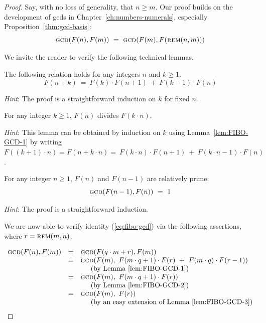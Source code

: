 \begin{proof}
Say, with no loss of generality,  that $n \geq m$.   Our proof builds on the development of {\sc gcd}s in Chapter~\ref{ch:numbers-numerals}, especially Proposition~\ref{thm:gcd-basis}:
\[ \mbox{\sc gcd}(F(n),F(m)) \ = \ \mbox{\sc gcd}(F(m), F(\mbox{\sc rem}(n,m))) \]

\medskip

\noindent
We invite the reader to verify the following technical lemmas.


\begin{lemma}
\label{lem:FIBO-GCD-1}
The following relation holds for any integers $n$ and $k \geq 1$.
\[  F(n+k) \ = \ F(k) \cdot F(n+1) \ + \ F(k-1) \cdot F(n) \] 
\end{lemma}

\noindent
{\em Hint}: The proof is a straightforward induction on $k$ for fixed $n$.

\begin{lemma}
\label{lem:FIBO-GCD-2}
For any integer $k \geq 1$, $F(n)$ divides $F(k \cdot n)$.
\end{lemma}

\noindent
{\em Hint}: This lemma can be obtained by induction on $k$ using Lemma~\ref{lem:FIBO-GCD-1}
by writing $F((k+1) \cdot n) = F(n + k \cdot n) = \ F(k \cdot n) \cdot F(n+1) \ + \ F(k \cdot n - 1) \cdot F(n)$.

\begin{lemma}
\label{lem:FIBO-GCD-3}
For any integer $n \geq 1$, $F(n)$ and $F(n-1)$ are relatively prime:
\[ \mbox{\sc gcd}(F(n-1), F(n)) \ = \ 1 \]
\end{lemma}

\noindent
{\em Hint}: The proof is a straightforward induction. 

\bigskip

\noindent
We are now able to verify identity (\ref{eq:fibo-gcd}) via the following assertions, where $r = \mbox{\sc rem}(m,n)$.

\[
\begin{array}{lcl}
\mbox{\sc gcd}(F(n),F(m)) & = & \mbox{\sc gcd}(F(q \cdot m + r),F(m) )  \\
  & = & \mbox{\sc gcd}(F(m), \ F(m \cdot q +1) \cdot F(r) \ + \ F(m \cdot q) \cdot F(r-1))  \\
  &    & \hspace*{.2in} \mbox{(by Lemma~\ref{lem:FIBO-GCD-1})} \\
  & =  & \mbox{\sc gcd}(F(m), \ F(m \cdot q +1) \cdot F(r) ) \\
  &     & \hspace*{.2in} \mbox{(by Lemma~\ref{lem:FIBO-GCD-2})} \\
  & = &  \mbox{\sc gcd}(F(m), \ F(r) ) \\
  &    & \hspace*{.2in} \mbox{(by an easy extension of Lemma~\ref{lem:FIBO-GCD-3})}
\end{array} \]


\end{proof}
